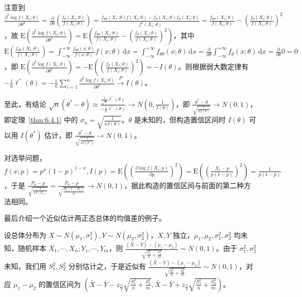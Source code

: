 \documentclass[../main.tex]{subfiles}
\begin{document}
注意到 $\frac{\partial^2\log f(X_i;\theta)}{\partial\theta^2}=\frac\partial{\partial\theta}\left(\frac{f_\theta(X_i;\theta)}{f(X_i;\theta)}\right)=\frac{f_{\theta\theta}(X_i;\theta)f(X_i;\theta)-f_\theta(X_i;\theta)f_\theta(X_i;\theta)}{f^2(X_i;\theta)}=\frac{f_{\theta\theta}(X_i;\theta)}{f(X_i;\theta)}-\left(\frac{f_\theta(X_i;\theta)}{f(X_i;\theta)}\right)^2$，故 $\mathrm E\left(\frac{\partial^2\log f(X_i;\theta)}{\partial\theta^2}\right)=\mathrm E\left(\frac{f_{\theta\theta}(X_i;\theta)}{f(X_i;\theta)}-\left(\frac{f_\theta(X_i;\theta)}{f(X_i;\theta)}\right)^2\right)$，其中 $\mathrm E(\frac{f_{\theta\theta}(X_i;\theta)}{f(X_i;\theta)})=\int_{-\infty}^{+\infty}\frac{f_{\theta\theta}(x;\theta)}{f(x;\theta)}f(x;\theta)\,\mathrm dx=\int_{-\infty}^{+\infty}f_{\theta\theta}(x;\theta)\,\mathrm dx=\frac{\partial}{\partial\theta}\int_{-\infty}^{+\infty}f_\theta(x;\theta)\,\mathrm dx=\frac{\partial}{\partial\theta}0=0$，即 $\mathrm E\left(\frac{\partial^2\log f(X_i;\theta)}{\partial\theta^2}\right)=-\mathrm E\left(\left(\frac{f_\theta(X_i;\theta)}{f(X_i;\theta)}\right)^2\right)=-I(\theta)$。则根据弱大数定律有 $-\frac1n\ell^{\prime\prime}(\theta)=-\frac1n\sum_{i=1}^n\frac{\partial^2\log f(X_i;\theta)}{\partial\theta^2}\overset{P}\rightarrow I(\theta)$。

至此，有结论 $\sqrt n(\theta^*-\theta)\approx\frac{\frac1{\sqrt n}\ell^\prime(\theta)}{-\frac1n\ell^{\prime\prime}(\theta)}\rightarrow N(0,\frac1{I(\theta)})$，即 $\frac{\theta^*-\theta}{\sqrt{\frac1{nI(\theta)}}}\rightarrow N(0,1)$，即定理~\ref{thm:6.4.1} 中的 $\sigma_n=\sqrt{\frac1{nI(\theta)}}$。$\theta$ 是未知的，但构造置信区间时 $I(\theta)$ 可以用 $I(\theta^*)$ 估计，即 $\frac{\theta^*-\theta}{\sqrt{\frac1{nI(\theta^*)}}}\rightarrow N(0,1)$。

对选举问题，$f(x;p)=p^x(1-p)^{1-x},I(p)=\mathrm E\left(\left(\frac{\partial\log f(X_i;p)}{\partial p}\right)^2\right)=\mathrm E\left(\left(\frac{X_i-p}{p(1-p)}\right)^2\right)=\frac1{p(1-p)}$，于是 $\frac{P_n-p}{\sqrt{\frac1{nI(P_n)}}}=\frac{P_n-p}{\sqrt{\frac{P_n(1-P_n)}n}}\rightarrow N(0,1)$，据此构造的置信区间与前面的第二种方法相同。

最后介绍一个近似估计两正态总体的均值差的例子。

\begin{example}
    设总体分布为 $X\sim N(\mu_1,\sigma_1^2),Y\sim N(\mu_2,\sigma_2^2)$，$X,Y$ 独立，$\mu_1,\mu_2,\sigma_1^2,\sigma_2^2$ 均未知，随机样本 $X_1,\cdots,X_n;Y_1,\cdots,Y_m$，则 $\frac{(\bar X-\bar Y)-(\mu_1-\mu_2)}{\sqrt{\frac{\sigma_1^2}n+\frac{\sigma_2^2}m}}\sim N(0,1)$。由于 $\sigma_1^2,\sigma_2^2$ 未知，我们用 $S_1^2,S_2^2$ 分别估计之，于是近似有 $\frac{(\bar X-\bar Y)-(\mu_1-\mu_2)}{\sqrt{\frac{S_1^2}n+\frac{S_2^2}m}}\sim N(0,1)$，对应 $\mu_1-\mu_2$ 的置信区间为 $(\bar X-\bar Y-z_{\frac\alpha2}\sqrt{\frac{S_1^2}n+\frac{S_2^2}m},\bar X-\bar Y+z_{\frac\alpha2}\sqrt{\frac{S_1^2}n+\frac{S_2^2}m})$。
\end{example}
\end{document}
